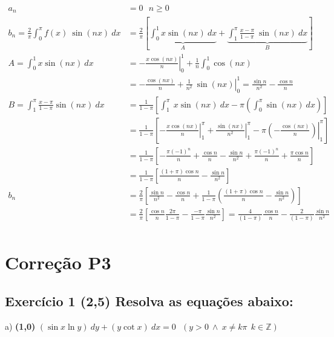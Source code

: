 \documentclass[12pt,openany, letterpaper]{book}
\newcommand{\E}[1]{Exercício #1}
\begin{document}
{{\begin{align*}
    a_n &= 0 \ \ \ n \geq 0 \\
    b_n = \frac{2}{\pi}\int_0^\pi f(x) \ \sin (nx) \ dx &= \frac{2}{\pi}\left[\underbrace{\int_0^1 x \sin (nx) \ dx}_A + \underbrace{\int_1^\pi \frac{x-\pi}{1-\pi} \ \sin (nx) \ dx}_B\right] \\
    A = \int_0^1 x \sin (nx) \ dx &= \left.-\frac{x \cos (nx)}{n}\right|_0^1 + \frac{1}{n}\int_0^1 \cos (nx) \\
    &= -\frac{\cos (nx)}{n} + \left.\frac{1}{n^2} \ \sin (nx)\right|_0^1  =\frac{\sin n}{n^2} - \frac{\cos n}{n}\\
    B = \int_1^\pi \frac{x-\pi}{1-\pi} \sin (nx) \ dx &= \frac{1}{1-\pi}\left[ \int_1^\pi \ x \sin (nx) \ dx - \pi \left( \int_0^\pi \sin (nx) \ dx \right) \right] \\
    &= \frac{1}{1-\pi}\left[ -\left.\frac{x \cos (nx)}{n} \right|_1^\pi + \left.\frac{\sin (nx)}{n^2}\right|_1^\pi - \pi \left.\left(-\frac{\cos (nx)}{n}\right)\right|_1^\pi\right] \\
    &= \frac{1}{1-\pi} \left[-\frac{\pi (-1)^n}{n} + \frac{\cos n}{n}-\frac{\sin n}{n^2}+\frac{\pi (-1)^n}{n} + \frac{\pi \cos n}{n}\right] \\
    &= \frac{1}{1-\pi} \left[\frac{(1+\pi) \cos n}{n} - \frac{\sin n}{n^2} \right] \\
    b_n &= \frac{2}{\pi} \left[\frac{\sin n}{n^2} - \frac{\cos n}{n} + \frac{1}{1-\pi} \left(\frac{(1+\pi) \cos n}{n} - \frac{\sin n}{n^2} \right)\right] \\
    &= \frac{2}{\pi} \left[\frac{\cos n}{n} \frac{2\pi}{1-\pi} - \frac{-\pi}{1-\pi} \frac{\sin n}{n^2}\right] = \frac{4}{(1-\pi)} \frac{\cos n}{n} - \frac{2}{(1-\pi)}\frac{\sin n}{n^2}\\
\end{align*}


\chapter{Correção P3}
\label{C:P3}

\section*{\E{1} (2,5) Resolva as equações abaixo:}

\hspace{5mm} a) \textbf{(1,0)} $(\sin x \ln y)\ dy + (y \cot x)\ dx = 0\ \ \ (y > 0 \ \land \ x \neq k\pi \ \ k \in \mathds{Z})$

}}
\end{document}
